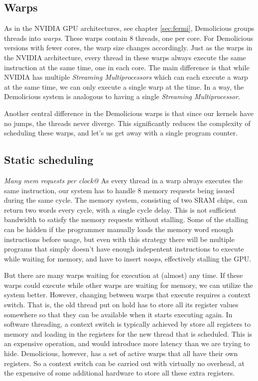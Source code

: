 \documentclass[../main/report.tex]{subfiles}
\begin{document}
\subsection{Warps}

As in the NVIDIA GPU architectures, see chapter \ref{sec:fermi}, Demolicious groups threads into \emph{warps}.
These warps contain 8 threads, one per core. 
For Demolicious versions with fewer cores, the warp size changes accordingly.
Just as the warps in the NVIDIA architecture, every thread in these warps always execute the same instruction at the same time, one in each core.
The main difference is that while NVIDIA has multiple \emph{Streaming Multiprocessors} which can each execute a warp at the same time, we can only execute a single warp at the time.
In a way, the Demolicious system is analogous to having a single \emph{Streaming Multiprocessor}.

Another central difference in the Demolicious warps is that since our kernels have no jumps, the threads never diverge.
This significantly reduces the complexity of scheduling these warps, and let's us get away with a single program counter.

\subsection{Static scheduling}

\emph{Many mem requests per clock@}
As every thread in a warp always executes the same instruction, our system has to handle 8 memory requests being issued during the same cycle.
The memory system, consisting of two SRAM chips, can return two words every cycle, with a single cycle delay.
This is not sufficient bandwidth to satisfy the memory requests without stalling.
Some of the stalling can be hidden if the programmer manually loads the memory word enough instructions before usage, but even with this strategy there will be multiple programs that simply doesn't have enough indepentent instructions to execute while waiting for memory, and have to insert \emph{noops}, effectively stalling the GPU.

But there are many warps waiting for execution at (almost) any time. 
If these warps could execute while other warps are waiting for memory, we can utilize the system better.
However, changing between warps that execute requires a context switch. 
That is, the old thread put on hold has to store all its register values somewhere so that they can be available when it starts executing again.
In software threading, a context switch is typically achieved by store all registers to memory and loading in the registers for the new thread that is scheduled.
This is an expensive operation, and would introduce more latency than we are trying to hide.
Demolicious, however, has a set of active warps that all have their own registers.
So a context switch can be carried out with virtually no overhead, at the expensive of some additional hardware to store all these extra registers.
\end{document}
